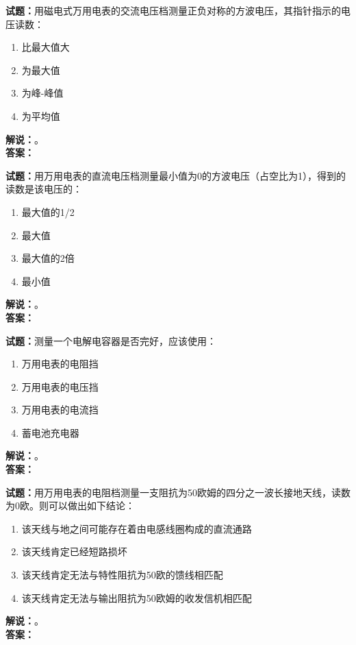 \documentclass{ctexbook}
\begin{document}
\bigskip




\noindent\textbf{试题：}用磁电式万用电表的交流电压档测量正负对称的方波电压，其指针指示的电压读数：
\begin{enumerate}[leftmargin=3em]
\item 比最大值大
\item 为最大值
\item 为峰-峰值
\item 为平均值
\end{enumerate}
\noindent\textbf{解说：}\textbf{}。\\\noindent\textbf{答案：}

\bigskip




\noindent\textbf{试题：}用万用电表的直流电压档测量最小值为0的方波电压（占空比为1），得到的读数是该电压的：
\begin{enumerate}[leftmargin=3em]
\item 最大值的1/2
\item 最大值
\item 最大值的2倍
\item 最小值
\end{enumerate}
\noindent\textbf{解说：}\textbf{}。\\\noindent\textbf{答案：}

\bigskip




\noindent\textbf{试题：}测量一个电解电容器是否完好，应该使用：
\begin{enumerate}[leftmargin=3em]
\item 万用电表的电阻挡
\item 万用电表的电压挡
\item 万用电表的电流挡
\item 蓄电池充电器
\end{enumerate}
\noindent\textbf{解说：}\textbf{}。\\\noindent\textbf{答案：}

\bigskip




\noindent\textbf{试题：}用万用电表的电阻档测量一支阻抗为50欧姆的四分之一波长接地天线，读数为0欧。则可以做出如下结论：
\begin{enumerate}[leftmargin=3em]
\item 该天线与地之间可能存在着由电感线圈构成的直流通路
\item 该天线肯定已经短路损坏
\item 该天线肯定无法与特性阻抗为50欧的馈线相匹配
\item 该天线肯定无法与输出阻抗为50欧姆的收发信机相匹配
\end{enumerate}
\noindent\textbf{解说：}\textbf{}。\\\noindent\textbf{答案：}
\end{document}
